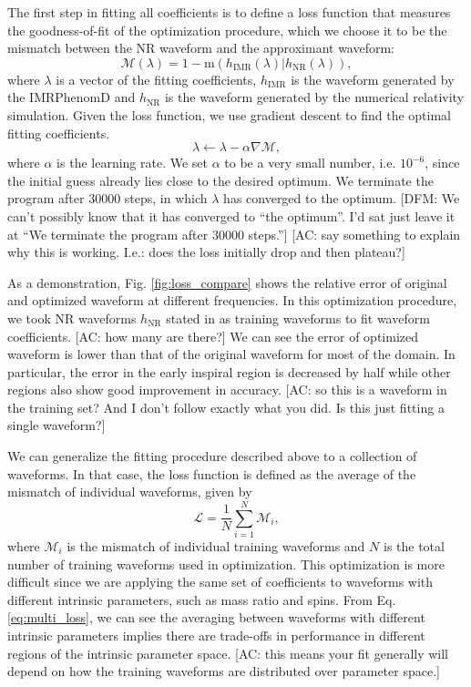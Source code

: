 \documentclass[twocolumn]{aastex631}
\newcommand{\dfm}[1]{{\color{dfm}[DFM: #1]}}
\newcommand{\amc}[1]{{\color{red}[AC: #1]}}
\begin{document}
The first step in fitting all coefficients is to define a loss function that
measures the goodness-of-fit of the optimization procedure, which we choose it
to be the mismatch between the NR waveform and the approximant waveform:
\begin{equation}
    \label{eq:mismatch}
	\mathcal{M}(\lambda)=1-\mathrm{m}(h_{\mathrm{IMR}}(\lambda)|h_{\mathrm{NR}}(\lambda)),
\end{equation}
where $\lambda$ is a vector of the fitting coefficients, $h_{\mathrm{IMR}}$ is
the waveform generated by the IMRPhenomD and $h_{\mathrm{NR}}$ is the waveform
generated by the numerical relativity simulation. 
Given the loss function, we use gradient descent to find the optimal fitting
coefficients.
\begin{equation}
	\lambda\leftarrow\lambda-\alpha\nabla\mathcal{M}, 
\end{equation}
where $\alpha$ is the learning rate. We set $\alpha$ to be a very small number, i.e. $10^{-6}$, since the initial guess already lies close to the desired optimum. We terminate the program after 30000 steps, in which $\lambda$ has converged to the optimum.  \dfm{We can't possibly know that it has converged to ``the optimum''. I'd sat just leave it at ``We terminate the program after 30000 steps.''}
\amc{say something to explain why this is working. I.e.: does the loss initially drop and then plateau?}

As a demonstration, Fig. \ref{fig:loss_compare} shows the relative error of
original and optimized waveform at different frequencies. In this optimization
procedure, we took NR waveforms $h_{\mathrm{NR}}$ stated in \citep{Khan:2015jqa}
as training waveforms to fit waveform coefficients. \amc{how many are there?}
We can see the error of optimized waveform is lower than that of the original waveform for most of the domain.
In particular, the error in the early inspiral region is decreased by half while other regions also show good improvement in accuracy. \amc{so this is a waveform in the training set? And I don't follow exactly what you did. Is this just fitting a single waveform?}

We can generalize the fitting procedure described above to a collection of waveforms.
In that case, the loss function is defined as the average of the mismatch of
individual waveforms, given by
\begin{equation}
	\mathcal{L}=\frac{1}{N}\sum_{i=1}^{N}\mathcal{M}_i,
    \label{eq:multi_loss}
\end{equation}
where $\mathcal{M}_i$ is the mismatch of individual training waveforms and $N$
is the total number of training waveforms used in optimization. This
optimization is more difficult since we are applying the same set of
coefficients to waveforms with different intrinsic parameters, such as mass
ratio and spins. From Eq. \ref{eq:multi_loss}, we can see the averaging between
waveforms with different intrinsic parameters implies there are trade-offs in
performance in different regions of the intrinsic parameter space.
\amc{this means your fit generally will depend on how the training waveforms are distributed over parameter space.}
\end{document}
